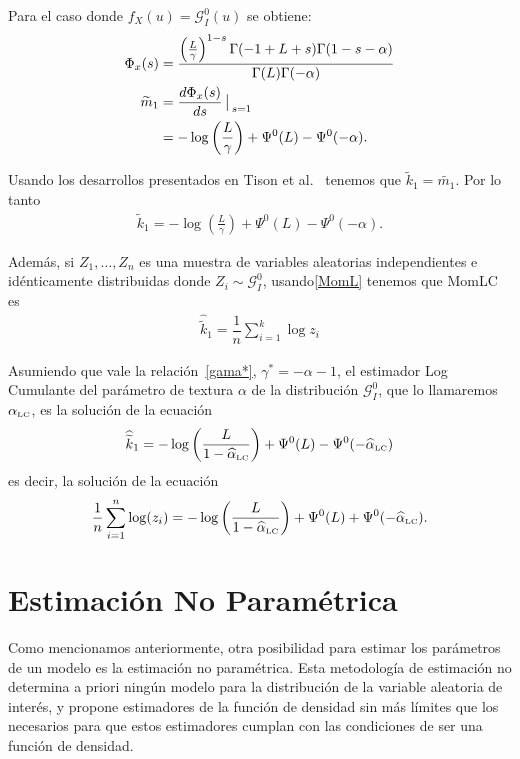 Para el caso donde $f_X(u) = \mathcal{G}_I^0(u)$ se obtiene:
	\begin{align}
	\Phi_x(s) &= \dfrac{\left(\frac{L}{\gamma}\right)^{1-s}\Gamma(-1+L+s)\Gamma(1-s-\alpha)}{\Gamma(L)\Gamma(-\alpha)} \\
	\vspace{1cm}
	\nonumber \widetilde{m}_1 &=  \frac{d \Phi_x(s)}{ds } \big\arrowvert _{s=1}\\
					& = -\log\left(\frac{L}{\gamma}\right) + \Psi^0(L) - \Psi^0(-\alpha).
	\end{align}

Usando los desarrollos presentados en Tison et al.~\cite{Tison2004} tenemos que $\widetilde{k}_1 = \widetilde{m_1}$. Por lo tanto 
\begin{align}
\label{MomLC}
\widetilde{k}_1 =   -\log \left(\frac{L}{\gamma}\right) + \Psi^0(L) - \Psi^0(-\alpha).
\end{align}

Además, si $Z_1,\ldots,Z_n$ es una muestra de variables aleatorias independientes e idénticamente distribuidas donde $Z_i \sim \mathcal{G}_I^0$, usando\eqref{MomL} tenemos que MomLC es
\begin{align}
\label{EstimadorMomLC}
\widehat{\widetilde{k}}_1 =\dfrac{1}{n} \sum_{i=1}^k\log z_i
\end{align}

Asumiendo que vale la relación~\eqref{gama*}, $\gamma^*=-\alpha-1$, el estimador Log Cumulante del parámetro de textura $\alpha$ de la distribución $\mathcal{G}_I^0$, que lo llamaremos $\alpha_{\text{\tiny{LC}}}$, es la solución de la ecuación    
\begin{align}
\widehat{\widetilde{k}}_1 =   -\log \left(\frac{L}{1-\widehat\alpha_{\text{\tiny{LC}}}}\right) + \Psi^0(L) - \Psi^0(-\widehat\alpha_{\text{\tiny{LC}}})
\end{align}
es decir, la solución de la ecuación
\begin{equation} \label{eq:logm}
\frac{1}{n} \sum_{i=1}^n\log (z_i) =   -\log \left(\frac{L}{1-\widehat\alpha_{\text{\tiny{LC}}}}\right) + \Psi^0(L) + \Psi^0(-\widehat\alpha_{\text{\tiny{LC}}}).
\end{equation}


\section{Estimación No Paramétrica}

Como mencionamos anteriormente, otra posibilidad para estimar los parámetros de un modelo es la estimación no paramétrica. Esta metodología de estimación  no determina a priori ningún modelo para la distribución de la variable aleatoria de interés, y propone estimadores de la función de densidad sin más límites que los necesarios para que estos estimadores cumplan con las condiciones de ser una función de densidad.

